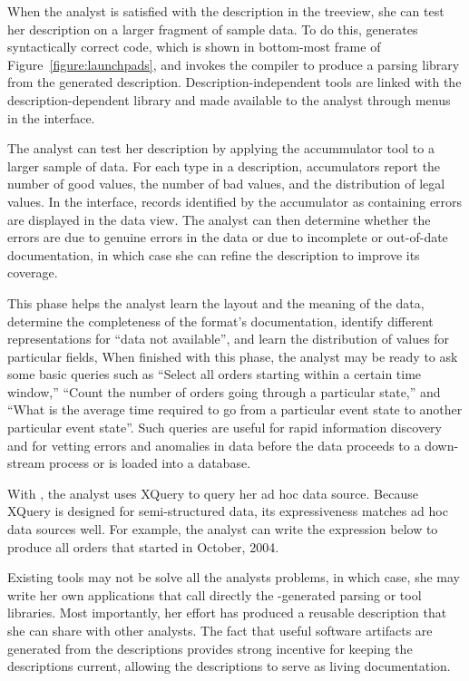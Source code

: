 When the analyst is satisfied with the description in the treeview,
she can test her description on a larger fragment of sample data.  To
do this, \launchpads{} generates syntactically correct \pads{} code,
which is shown in bottom-most frame of Figure~\ref{figure:launchpads},
and invokes the \pads{} compiler to produce a parsing library from the
generated description.  Description-independent tools are linked with
the description-dependent library and made available to the analyst
through menus in the \launchpads{} interface.  

The analyst can test her description by applying the accummulator tool
to a larger sample of data.  For each type in a \pads{} description,
accumulators report the number of good values, the number of bad
values, and the distribution of legal values.  In the \launchpads{}
interface, records identified by the accumulator as containing errors
are displayed in the data view.  The analyst can then determine
whether the errors are due to genuine errors in the data or due to
incomplete or out-of-date documentation, in which case she can refine
the description to improve its coverage.

This phase helps the analyst learn the layout and the meaning of the
data, determine the completeness of the format's documentation,
identify different representations for ``data not available'', and
learn the distribution of values for particular fields, \etc{}  When
finished with this phase, the analyst may be ready to ask some basic
queries such as ``Select all orders starting within a certain time
window,'' ``Count the number of orders going through a particular
state,'' and ``What is the average time required to go from a
particular event state to another particular event state''.  Such
queries are useful for rapid information discovery and for vetting
errors and anomalies in data before the data proceeds to a
down-stream process or is loaded into a database.

With \pads{}, the analyst uses XQuery to query her ad hoc data source.
Because XQuery is designed for semi-structured data, its
expressiveness matches ad hoc data sources well.  For example, the
analyst can write the expression below to produce all orders
that started in October, 2004.

Existing \pads{} tools may not be solve all the analysts problems,
in which case, she may write her own \pads{} applications that call  directly
the \pads{}-generated parsing or tool libraries.  Most
importantly, her effort has produced a reusable description that she
can share with other analysts.  The fact that useful software
artifacts are generated from the descriptions provides strong
incentive for keeping the descriptions current, allowing the descriptions to serve
as living documentation.


